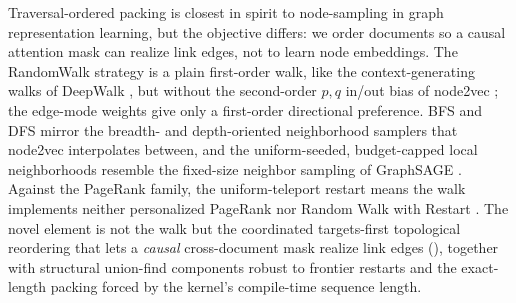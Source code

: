 Traversal-ordered packing is closest in spirit to node-sampling in graph representation
learning, but the objective differs: we order documents so a causal attention mask can
realize link edges, not to learn node embeddings. The RandomWalk strategy is a plain
first-order walk, like the context-generating walks of DeepWalk
\citep{perozzi2014deepwalk}, but without the second-order $p,q$ in/out bias of node2vec
\citep{grover2016node2vec}; the edge-mode weights give only a first-order directional
preference. BFS and DFS mirror the breadth- and depth-oriented neighborhood samplers
that node2vec interpolates between, and the uniform-seeded, budget-capped local
neighborhoods resemble the fixed-size neighbor sampling of GraphSAGE
\citep{hamilton2017graphsage}. Against the PageRank family, the uniform-teleport restart
means the walk implements neither personalized PageRank nor Random Walk with Restart
\citep{page1999pagerank,tong2006rwr}. The novel element is not the walk but the
coordinated targets-first topological reordering that lets a \emph{causal} cross-document
mask realize link edges (), together with structural union-find
components robust to frontier restarts and the exact-length packing forced by the
kernel's compile-time sequence length.
